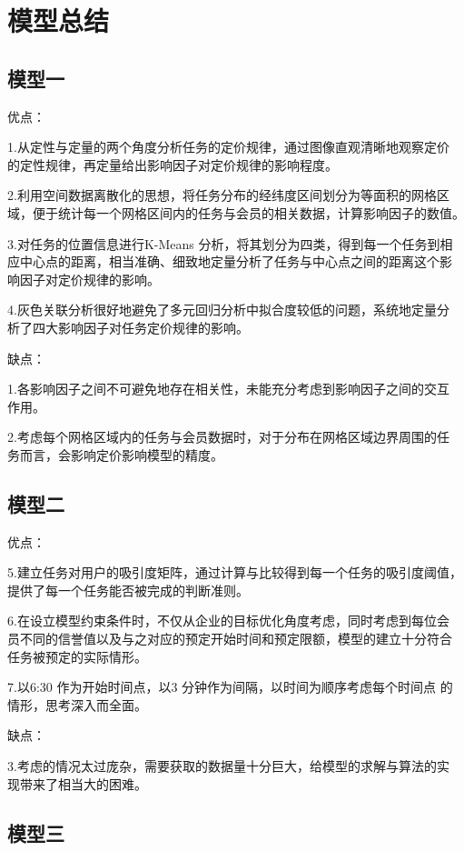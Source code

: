 \documentclass[withoutpreface,bwprint]{cumcmthesis} %
\begin{document}
\section{模型总结}
\subsection{模型一}

优点：

1.从定性与定量的两个角度分析任务的定价规律，通过图像直观清晰地观察定价
的定性规律，再定量给出影响因子对定价规律的影响程度。

2.利用空间数据离散化的思想，将任务分布的经纬度区间划分为等面积的网格区
域，便于统计每一个网格区间内的任务与会员的相关数据，计算影响因子的数值。

3.对任务的位置信息进行K-Means 分析，将其划分为四类，得到每一个任务到相
应中心点的距离，相当准确、细致地定量分析了任务与中心点之间的距离这个影
响因子对定价规律的影响。

4.灰色关联分析很好地避免了多元回归分析中拟合度较低的问题，系统地定量分
析了四大影响因子对任务定价规律的影响。

缺点：

1.各影响因子之间不可避免地存在相关性，未能充分考虑到影响因子之间的交互
作用。

2.考虑每个网格区域内的任务与会员数据时，对于分布在网格区域边界周围的任
务而言，会影响定价影响模型的精度。

\subsection{模型二}

优点：

5.建立任务对用户的吸引度矩阵，通过计算与比较得到每一个任务的吸引度阈值，
提供了每一个任务能否被完成的判断准则。

6.在设立模型约束条件时，不仅从企业的目标优化角度考虑，同时考虑到每位会
员不同的信誉值以及与之对应的预定开始时间和预定限额，模型的建立十分符合
任务被预定的实际情形。

7.以6:30 作为开始时间点，以3 分钟作为间隔，以时间为顺序考虑每个时间点
的情形，思考深入而全面。

缺点：

3.考虑的情况太过庞杂，需要获取的数据量十分巨大，给模型的求解与算法的实
现带来了相当大的困难。

\subsection{模型三}
\end{document}
